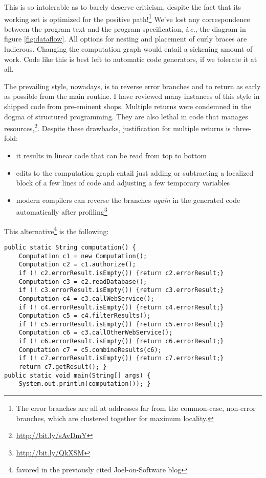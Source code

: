 \documentclass[11pt]{article}
\begin{document}
This is so intolerable as to barely deserve criticism, despite the
fact that its working set is optimized for the positive
path!\footnote{The error branches are all at addresses far from the
   common-case, non-error branches, which are clustered together for
   maximum locality.} We've lost any correspondence between the
program text and the program specification, \emph{i.e.}, the diagram in
figure \ref{fig:dataflow}. All options for nesting and placement of
curly braces are ludicrous. Changing the computation graph would
entail a sickening amount of work. Code like this is best left to
automatic code generators, if we tolerate it at all.

The prevailing style, nowadays, is to reverse error branches and to
return as early as possible from the main routine. I have reviewed
many instances of this style in shipped code from pre-eminent
shops. Multiple returns were condemned in the dogma of structured
programming. They are also lethal in code that manages
resources,\footnote{\url{http://bit.ly/sAvDmY}}. Despite these drawbacks,
justification for multiple returns is three-fold:
\begin{itemize}
\item it results in linear code that can be read from top to bottom
\item edits to the computation graph entail just adding or subtracting
a localized block of a few lines of code and adjusting a few
temporary variables
\item modern compilers can reverse the branches \emph{again} in the
generated code automatically after
profiling\footnote{\url{http://bit.ly/QkXSM}}
\end{itemize}

This alternative\footnote{favored in the previously cited
   Joel-on-Software blog} is the following:
\begin{verbatim}
public static String computation() {
    Computation c1 = new Computation();
    Computation c2 = c1.authorize();
    if (! c2.errorResult.isEmpty()) {return c2.errorResult;}
    Computation c3 = c2.readDatabase();
    if (! c3.errorResult.isEmpty()) {return c3.errorResult;}
    Computation c4 = c3.callWebService();
    if (! c4.errorResult.isEmpty()) {return c4.errorResult;}
    Computation c5 = c4.filterResults();
    if (! c5.errorResult.isEmpty()) {return c5.errorResult;}
    Computation c6 = c3.callOtherWebService();
    if (! c6.errorResult.isEmpty()) {return c6.errorResult;}
    Computation c7 = c5.combineResults(c6);
    if (! c7.errorResult.isEmpty()) {return c7.errorResult;}
    return c7.getResult(); }
public static void main(String[] args) {
    System.out.println(computation()); }
\end{verbatim}
\end{document}
